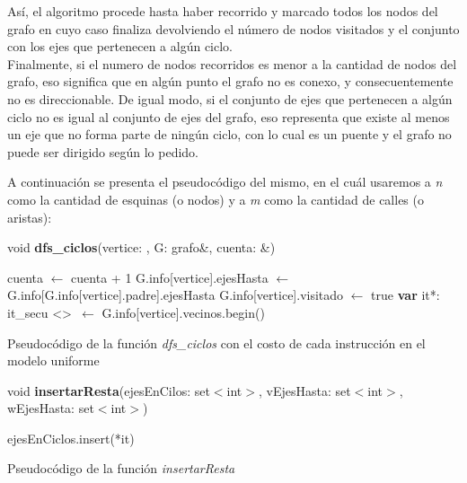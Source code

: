 Así, el algoritmo procede hasta haber recorrido y marcado todos los nodos del grafo en cuyo caso finaliza devolviendo el número de nodos visitados y el conjunto con los ejes que pertenecen a algún ciclo. \\
Finalmente, si el numero de nodos recorridos es menor a la cantidad de nodos del grafo, eso significa que en algún punto el grafo no es conexo, y consecuentemente no es direccionable. De igual modo, si el conjunto de ejes que pertenecen a algún ciclo no es igual al conjunto de ejes del grafo, eso representa que existe al menos un eje que no forma parte de ningún ciclo, con lo cual es un puente y el grafo no puede ser dirigido según lo pedido.

A continuación se presenta el pseudocódigo del mismo, en el cuál usaremos a \textit{n} como la cantidad de esquinas (o nodos) y a \textit{m} como la cantidad de calles (o aristas): \\

\incmargin{1em}
\linesnumbered
{}

void \textbf{dfs\_ciclos}(vertice: \nat, G: grafo\&, cuenta: \nat\&) \\
\begin{algorithm}[H]
	\BlankLine
	cuenta $\leftarrow$ cuenta + 1 
	G.info[vertice].ejesHasta $\leftarrow$ G.info[G.info[vertice].padre].ejesHasta 
	G.info[vertice].visitado $\leftarrow$ true 
	\BlankLine
	\textbf{var} it*: it\_secu \textless \nat \textgreater \ $\leftarrow $ G.info[vertice].vecinos.begin() 
	\BlankLine

	\caption{Pseudocódigo de la función \textit{dfs\_ciclos} con el costo de cada instrucción en el modelo uniforme}
\end{algorithm}


\incmargin{1em}
\linesnumbered
{}

void \textbf{insertarResta}(ejesEnCilos: set$<$int$>$, vEjesHasta: set$<$int$>$, wEjesHasta: set$<$int$>$) \\
\begin{algorithm}[H]
	\BlankLine
	 {
		 {ejesEnCiclos.insert(*it)}
	}
	
	 
	\caption{Pseudocódigo de la función \textit{insertarResta}}
\end{algorithm}

